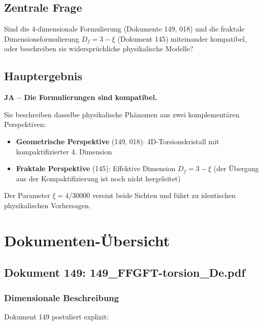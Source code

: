 	\subsection{Zentrale Frage}
	
	\begin{important}
		Sind die 4-dimensionale Formulierung (Dokumente 149, 018) und die fraktale Dimensionsformulierung $D_f = 3-\xi$ (Dokument 145) miteinander kompatibel, oder beschreiben sie widersprüchliche physikalische Modelle?
	\end{important}
	
	\subsection{Hauptergebnis}
	
	\begin{keyresult}
		\textbf{JA -- Die Formulierungen sind kompatibel.}
		
		Sie beschreiben dasselbe physikalische Phänomen aus zwei komplementären Perspektiven:
		\begin{itemize}
			\item \textbf{Geometrische Perspektive} (149, 018): 4D-Torsionskristall mit kompaktifizierter 4. Dimension
			\item \textbf{Fraktale Perspektive} (145): Effektive Dimension $D_f = 3-\xi$ (der Übergang aus der Kompaktifizierung ist noch nicht hergeleitet)
		\end{itemize}
		
		Der Parameter $\xi = 4/30000$ vereint beide Sichten und führt zu identischen physikalischen Vorhersagen.
	\end{keyresult}
	
	\section{Dokumenten-Übersicht}
	
	\subsection{Dokument 149: 149\_FFGFT-torsion\_De.pdf}
	
	\subsubsection{Dimensionale Beschreibung}
	
	Dokument 149 postuliert explizit:
	
